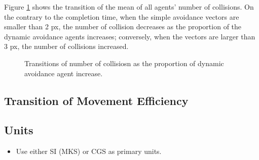 \documentclass[letterpaper, 10 pt, conference]{ieeeconf}  %
\begin{document}
Figure \ref{fig:result_collisions} shows the transition of the mean of all agents' number of collisions. On the contrary to the completion time, when the simple avoidance vectors are smaller than 2 px, the number of collision decreases as the proportion of the dynamic avoidance agents increases; conversely, when the vectors are larger than 3 px, the number of collisions increased. 

\begin{figure}[thpb]
   \centering
   \caption{Transitions of number of collisiosn as the proportion of dynamic avoidance agent increase.}
   \label{fig:result_collisions}
\end{figure}

\subsection{Transition of Movement Efficiency}

\subsection{Units}

\begin{itemize}
\item Use either SI (MKS) or CGS as primary units. 
\end{itemize}
\end{document}
